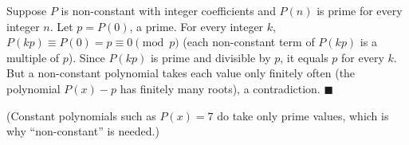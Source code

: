 Suppose $P$ is non-constant with integer coefficients and $P(n)$ is prime for every integer $n$. Let $p=P(0)$, a prime. For every integer $k$, $P(kp)\equiv P(0)=p\equiv0\pmod p$ (each non-constant term of $P(kp)$ is a multiple of $p$). Since $P(kp)$ is prime and divisible by $p$, it equals $p$ for every $k$. But a non-constant polynomial takes each value only finitely often (the polynomial $P(x)-p$ has finitely many roots), a contradiction. $\blacksquare$

(Constant polynomials such as $P(x)=7$ do take only prime values, which is why ``non-constant'' is needed.)
